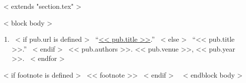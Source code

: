 ~< extends "section.tex" >~

~< block body >~
  \begin{enumerate}
    ~< for pub in items >~
      \item{
        ~< if pub.url is defined >~
          ``\href{<< pub.url >>}{<< pub.title >>}.''
        ~< else >~
          ``<< pub.title >>.''
        ~< endif >~
        << pub.authors >>.
        << pub.venue >>,
        << pub.year >>.
      }
    ~< endfor >~
  \end{enumerate}
  ~< if footnote is defined >~
   {\hspace*{10mm} \scriptsize << footnote >> }
  ~< endif >~
~< endblock body >~
